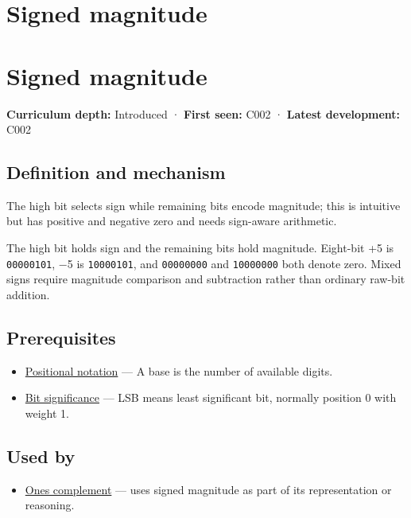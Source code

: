 \hypertarget{appendix-ce20506c8532}{}
\section*{Signed magnitude}
\section{Signed magnitude}\label{appendix-ce20506c8532-signed-magnitude}

\textbf{Curriculum depth:} Introduced · \textbf{First seen:} C002 · \textbf{Latest development:} C002

\subsection{Definition and mechanism}\label{appendix-ce20506c8532-definition-and-mechanism}

The high bit selects sign while remaining bits encode magnitude; this is intuitive but has positive and negative zero and needs sign-aware arithmetic.

The high bit holds sign and the remaining bits hold magnitude. Eight-bit +5 is \texttt{00000101}, −5 is \texttt{10000101}, and \texttt{00000000} and \texttt{10000000} both denote zero. Mixed signs require magnitude comparison and subtraction rather than ordinary raw-bit addition.

\subsection{Prerequisites}\label{appendix-ce20506c8532-prerequisites}

\begin{itemize}
\tightlist
\item
  \hyperref[appendix-83c3f28f7bda]{Positional notation} --- A base is the number of available digits.
\item
  \hyperref[appendix-280445746493]{Bit significance} --- LSB means least significant bit, normally position 0 with weight 1.
\end{itemize}

\subsection{Used by}\label{appendix-ce20506c8532-used-by}

\begin{itemize}
\tightlist
\item
  \hyperref[appendix-03c678cd40b3]{One\textquotesingle s complement} --- uses signed magnitude as part of its representation or reasoning.
\end{itemize}

